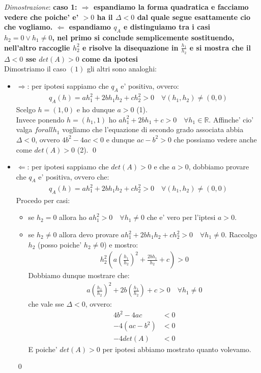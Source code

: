 \documentclass{article}
\begin{document}
\noindent \emph{Dimostrazione}: \textbf{caso 1: $\Rightarrow$ espandiamo la forma
quadratica e facciamo vedere che poiche' e' $>0$ ha il $\Delta < 0$ dal quale
segue esattamente cio che vogliamo. $\Leftarrow$ espandiamo $q_A$ e distinguiamo
tra i casi $h_2 = 0 \vee h_1 \neq 0$, nel primo si conclude semplicemente sostituendo,
nell'altro raccoglie $h_2^2$ e risolve la disequazione in $\frac{h_1}{h_2}$ e si
mostra che il $\Delta < 0$ sse $det(A)>0$ come da ipotesi} \\
Dimostriamo il caso $(1)$ gli altri sono analoghi:
\begin{itemize}
  \item $\Rightarrow$: per ipotesi sappiamo che $q_A$ e' positiva, ovvero:
    \begin{align*}
      q_A(h) = ah_1^2 + 2bh_1h_2 + ch_2^2 > 0 \quad \forall (h_1, h_2) \neq (0,0)
    \end{align*}
    Scelgo $h=(1,0)$ e ho dunque $a>0$ (1). \\
    Invece ponendo $h=(h_1, 1)$ ho $ah_1^2 + 2bh_1 + c > 0 \quad \forall h_1 \in \mathbb{R}$.
    Affinche' cio' valga $forall h_1$ vogliamo che l'equazione di secondo grado
    associata abbia $\Delta < 0$, ovvero $4b^2-4ac < 0$ e dunque $ac-b^2 > 0$
    che possiamo vedere anche come $det(A) > 0$ (2). \qed
  \item $\Leftarrow$: per ipotesi sappiamo che $det(A) > 0$ e che $a > 0$, dobbiamo
    provare che $q_A$ e' positiva, ovvero che:
    \begin{align*}
      q_A(h) = ah_1^2 + 2bh_1h_2 + ch_2^2 > 0 \quad \forall (h_1, h_2) \neq (0,0)
    \end{align*}
    Procedo per casi:
    \begin{itemize}
      \item se $h_2 = 0$ allora ho $ah_1^2 > 0 \quad \forall h_1 \neq 0$ che
        e' vero per l'iptesi $a>0$.
      \item se $h_2 \neq 0$ allora devo provare $ah_1^2 + 2bh_1h_2 + ch_2^2
        > 0 \quad \forall h_1 \neq 0$. Raccolgo $h_2$ (posso poiche' $h_2 \neq 0$) e mostro:
        \begin{align*}
          h_2^2(a(\frac{h_1}{h_2})^2 + \frac{2bh_1}{h_2} + c) > 0
        \end{align*}
        Dobbiamo dunque mostrare che:
        \begin{align*}
          a(\frac{h_1}{h_2})^2 + 2b(\frac{h_1}{h_2}) + c > 0 \quad \forall h_1 \neq 0
        \end{align*}
        che vale sse $\Delta < 0$, ovvero:
        \begin{align*}
          4b^2-4ac &< 0 \\
          -4(ac - b^2) &< 0 \\
          -4det(A) &< 0
        \end{align*}
        E poiche' $det(A)>0$ per ipotesi abbiamo mostrato quanto volevamo.
    \end{itemize}
    \qed
\end{itemize}
\end{document}
